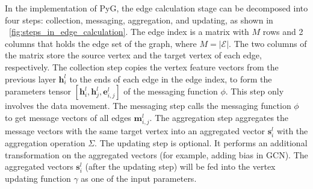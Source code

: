 In the implementation of PyG, the edge calculation stage can be decomposed into four steps: collection, messaging, aggregation, and updating, as shown in \figurename~\ref{fig:steps_in_edge_calculation}.
The edge index is a matrix with $M$ rows and 2 columns that holds the edge set of the graph, where $M=|\mathcal{E}|$.
The two columns of the matrix store the source vertex and the target vertex of each edge, respectively.
The collection step copies the vertex feature vectors from the previous layer $\boldsymbol{h}_i^l$ to the ends of each edge
in the edge index, to form the parameters tensor $[\boldsymbol{h}^l_i, \boldsymbol{h}^l_{j}, \boldsymbol{e}^l_{i,j}]$ of the messaging function $\phi$.
This step only involves the data movement.
The messaging step calls the messaging function $\phi$ to get message vectors of all edges $\boldsymbol{m}_{i, j}^l$.
The aggregation step aggregates the message vectors with the same target vertex into an aggregated vector $\boldsymbol{s}^l_i$ with the aggregation operation $\Sigma$.
The updating step is optional.
It performs an additional transformation on the aggregated vectors (for example, adding bias in GCN).
The aggregated vectors $\boldsymbol{s}^l_i$ (after the updating step) will be fed into the vertex updating function $\gamma$ as one of the input parameters.

